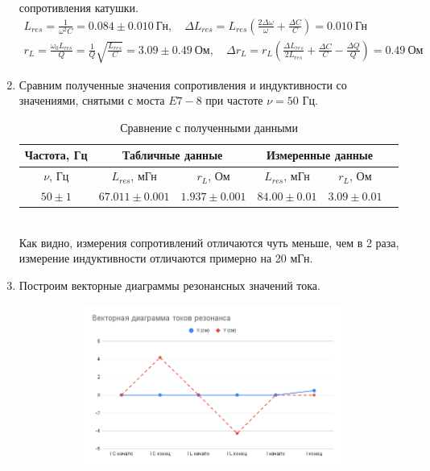 \documentclass[a4paper, 12pt]{article}
\begin{document}
\begin{enumerate}
    сопротивления катушки.
    \begin{align}
        L_{res}  = \frac{1}{\omega^{2}C} = 0.084\pm 0.010\ \text{Гн}, \quad
        \Delta L_{res} = L_{res}\left(\frac{2\Delta \omega}{\omega} + \frac{\Delta C}{C}\right) = 0.010\ \text{Гн}\\
        r_L = \frac{\omega_0 L_{res}}{Q} = \frac{1}{Q} \sqrt{\frac{L_{res}}{C}} = 3.09\pm 0.49\ \text{Ом},\quad
        \Delta r_L = r_L\left(\frac{\Delta L_{res}}{2L_{res}} + \frac{\Delta C}{C} - \frac{\Delta Q}{Q}\right) = 0.49\ \text{Ом}
    \end{align}
    \newpage
    \item Сравним полученные значения сопротивления и индуктивности со значениями, снятыми с моста $E7-8$ при частоте $\nu = 50$ Гц.
    \begin{table}[htbp]
        \centering
        \begin{tabular}{|c|c|c|c|c|c}
            \hline
            Частота, Гц & \multicolumn{2}{|c|}{Табличные данные} & \multicolumn{2}{|c|}{Измеренные данные}\\
            \hline
            $\nu$, Гц & $L_{res}$, мГн & $r_{L}$, Ом &  $L_{res}$, мГн & $r_{L}$, Ом\\
            $50\pm 1$ & $67.011\pm 0.001$ & $1.937\pm 0.001$ & $84.00\pm 0.01$ & $3.09\pm 0.01$\\
            \hline
        \end{tabular}
        \caption{Сравнение с полученными данными}
        \label{Сравнение с полученными данными}
    \end{table}\\
    Как видно, измерения сопротивлений отличаются чуть меньше, чем в 2 раза, измерение индуктивности отличаются примерно на 20 мГн.
    \item Построим векторные диаграммы резонансных значений тока.
    \begin{figure}[htbp]
        \begin{subfigure}{0.45\textwidth}
            \includegraphics[width=\linewidth]{vec_diag.png}

\end{subfigure}
\end{figure}
\end{enumerate}
\end{document}
